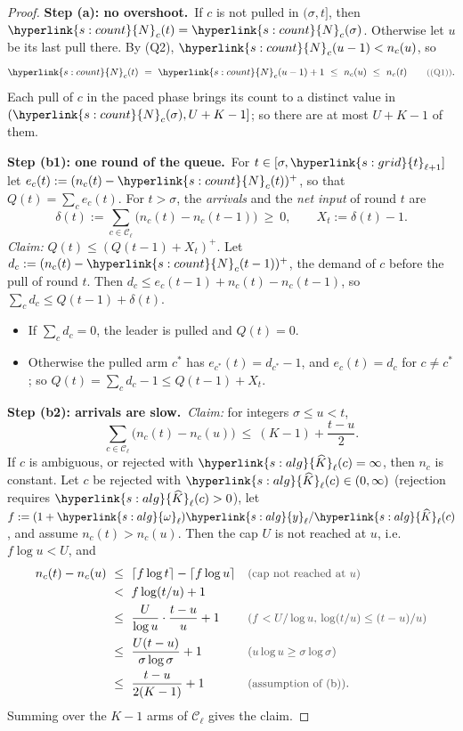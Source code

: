 \documentclass[10pt]{article}
\newcommand{\sy}[2]{{\hyperlink{#1}{#2}}}
\newcommand{\1}{\mathbf{1}}
\newcommand{\Ng}{\sy{s:count}{N}}
\newcommand{\tl}{\sy{s:grid}{t}}
\newcommand{\yg}{\sy{s:alg}{y}}
\newcommand{\Kh}{\sy{s:alg}{\widehat K}}
\newcommand{\om}{\sy{s:alg}{\omega}}
\newcommand{\stp}[2]{\par\medskip\noindent\textbf{Step #1: #2.}\ }
\newcommand{\why}[1]{\text{\small\color{black!70}(#1)}}
\begin{document}
\begin{proof}
\stp{(a)}{no overshoot}If $c$ is not pulled in $(\sigma,t]$, then $\Ng_c(t)=\Ng_c(\sigma)$. Otherwise let $u$ be its last pull there. By (Q2), $\Ng_c(u-1)<n_c(u)$, so
\[
\Ng_c(t)\ =\ \Ng_c(u-1)+1\ \le\ n_c(u)\ \le\ n_c(t)\qquad\why{(Q1)}.
\]
Each pull of $c$ in the paced phase brings its count to a distinct value in $(\Ng_c(\sigma),U+K-1]$; so there are at most $U+K-1$ of them.

\stp{(b1)}{one round of the queue}For $t\in[\sigma,\tl_{\ell+1}]$ let $e_c(t):=(n_c(t)-\Ng_c(t))^+$, so that $Q(t)=\sum_ce_c(t)$. For $t>\sigma$, the \emph{arrivals} and
the \emph{net input} of round $t$ are
\[
\delta(t):=\sum_{c\in\mathcal C_\ell}\big(n_c(t)-n_c(t-1)\big)\ \ge\ 0,\qquad X_t:=\delta(t)-1 .
\]
\emph{Claim:} $Q(t)\le(Q(t-1)+X_t)^+$. Let $d_c:=(n_c(t)-\Ng_c(t-1))^+$, the demand of $c$ before the pull of round $t$. Then
$d_c\le e_c(t-1)+n_c(t)-n_c(t-1)$, so $\sum_cd_c\le Q(t-1)+\delta(t)$.
\begin{itemize}
\item If $\sum_cd_c=0$, the leader is pulled and $Q(t)=0$.
\item Otherwise the pulled arm $c^\ast$ has $e_{c^\ast}(t)=d_{c^\ast}-1$, and $e_c(t)=d_c$ for $c\ne c^\ast$; so $Q(t)=\sum_cd_c-1\le Q(t-1)+X_t$.
\end{itemize}

\stp{(b2)}{arrivals are slow}\emph{Claim:} for integers $\sigma\le u<t$,
\[
\sum_{c\in\mathcal C_\ell}\big(n_c(t)-n_c(u)\big)\ \le\ (K-1)+\frac{t-u}2 .
\]
If $c$ is ambiguous, or rejected with $\Kh_\ell(c)=\infty$, then $n_c$ is constant. Let $c$ be rejected with $\Kh_\ell(c)\in(0,\infty)$ (rejection requires
$\Kh_\ell(c)>0$), let $f:=(1+\om_\ell)\yg_\ell/\Kh_\ell(c)$, and assume $n_c(t)>n_c(u)$. Then the cap $U$ is not reached at $u$, i.e.\ $f\log u<U$, and
\begin{align*}
n_c(t)-n_c(u)\ &\le\ \lceil f\log t\rceil-\lceil f\log u\rceil&&\why{cap not reached at $u$}\\
&<\ f\log(t/u)+1\\
&\le\ \frac U{\log u}\cdot\frac{t-u}u+1&&\why{$f<U/\log u$, $\log(t/u)\le(t-u)/u$}\\
&\le\ \frac{U(t-u)}{\sigma\log\sigma}+1&&\why{$u\log u\ge\sigma\log\sigma$}\\
&\le\ \frac{t-u}{2(K-1)}+1&&\why{assumption of (b)}.
\end{align*}
Summing over the $K-1$ arms of $\mathcal C_\ell$ gives the claim.


\end{proof}
\end{document}
